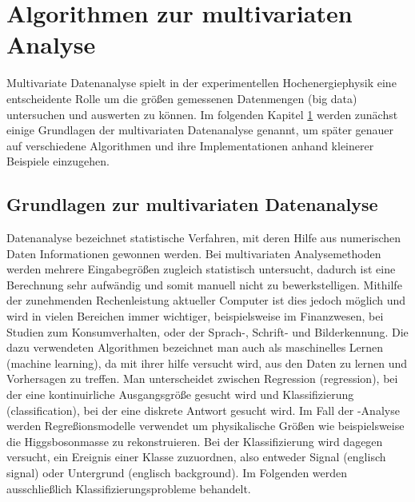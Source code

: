\chapter{Algorithmen zur multivariaten Analyse}
\label{ch:algorithmen}

{}	%

Multivariate Datenanalyse spielt in der experimentellen Hochenergiephysik eine entscheidente Rolle um die gr\"o\ss en gemessenen Datenmengen (big data) untersuchen und auswerten zu k\"onnen. Im folgenden Kapitel \ref{ch:algorithmen} werden zun\"achst einige Grundlagen der multivariaten Datenanalyse genannt, um sp\"ater genauer auf verschiedene Algorithmen und ihre Implementationen anhand kleinerer Beispiele einzugehen.

\section{Grundlagen zur multivariaten Datenanalyse}
\label{ch:Theorie:sec:Algorithmen}

Datenanalyse bezeichnet statistische Verfahren, mit deren Hilfe aus numerischen Daten Informationen gewonnen werden.
Bei multivariaten Analysemethoden werden mehrere Eingabegr\"o\ss en zugleich statistisch untersucht, dadurch ist eine Berechnung sehr aufw\"andig und somit manuell nicht zu bewerkstelligen. Mithilfe der zunehmenden Rechenleistung aktueller Computer ist dies jedoch m\"oglich und wird in vielen Bereichen immer wichtiger, beispielsweise im Finanzwesen, bei Studien zum Konsumverhalten, oder der Sprach-, Schrift- und Bilderkennung.
Die dazu verwendeten Algorithmen bezeichnet man auch als maschinelles Lernen (machine learning), da mit ihrer hilfe versucht wird, aus den Daten zu lernen und Vorhersagen zu treffen. Man unterscheidet zwischen Regression (regression), bei der eine kontinuirliche Ausgangsgr\"o\ss e gesucht wird und Klassifizierung (classification), bei der eine diskrete Antwort gesucht wird.\cite{SWB-455193959} Im Fall der \ttH-Analyse werden Regre\ss ionsmodelle verwendet um physikalische Gr\"o\ss en wie beispielsweise die Higgsbosonmasse zu rekonstruieren. Bei der Klassifizierung wird dagegen versucht, ein Ereignis einer Klasse zuzuordnen, also entweder Signal (englisch signal) oder Untergrund (englisch background). Im Folgenden werden ausschlie\ss lich Klassifizierungsprobleme behandelt.

